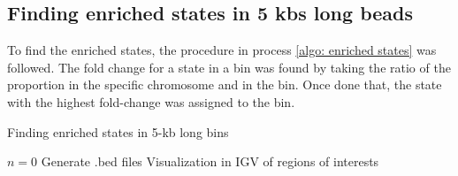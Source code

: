 \subsection{Finding enriched states in 5 kbs long beads}

To find the enriched states, the procedure in process \ref{algo: enriched states} was followed. The fold change for a state in a bin was found by taking the ratio of the proportion in the specific chromosome and in the bin. Once done that, the state with the highest fold-change was assigned to the bin.


\begin{algorithm}
    \caption{Finding enriched states in 5-kb long bins}\label{algo: enriched states}
    $n = 0$\;
    Generate .bed files
    Visualization in IGV of regions of interests
\end{algorithm}

